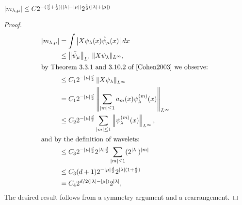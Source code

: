 \begin{lemma} \label{lem:matrix_bound}
	$\left| m_{\lambda,\mu} \right| \leq C 2^{-(\frac{d}{2}+\frac{1}{2})\left| \left| \lambda \right|-\left| \mu \right| \right|}2^{\frac{1}{2}(\left| \lambda \right|+\left| \mu \right|)}$
\end{lemma}
\begin{proof}
	\begin{align*}
		\abs{m_{\lambda,\mu}} 	&= \int \abs{X \psi_{\lambda}(x) \tilde{\psi}_{\mu}(x)} dx \\
								&\leq \norm{\tilde{\psi}_\mu}_{L^1} \| X \psi_\lambda \|_{L^\infty}, \\ %
							\intertext{by Theorem 3.3.1 and 3.10.2 of \cite{Cohen2003} we observe: }
								&\leq C_1 2^{-\card{\mu}\frac{d}{2}}\norm{X\psi_{\lambda}}_{L^{\infty}} \\
								&= C_1 2^{-\card{\mu}\frac{d}{2}}\norm{ \sum_{\abs{m} \leq 1 } a_m(x) \psi^{(m)}_\lambda(x) }_{L^{\infty}} \\
								&\leq C_2 2^{-\card{\mu}\frac{d}{2}}\sum_{\card{m}\leq 1}\norm{\psi_{\lambda}^{(m)}(x)}_{L^{\infty}} , \\
							\intertext{and by the definition of wavelets:}
								&\leq C_3 2^{-\card{\mu}\frac{d}{2}} 2^{\card{\lambda}\frac{d}{2}} \sum_{\card{m}\leq 1} (2^{\card{\lambda}})^{\abs{m}} \\
								&\leq C_3 (d+1) 2^{-\card{\mu}\frac{d}{2}} 2^{\card{\lambda}(1+\frac{d}{2})} \\
								&= C_4 2^{d/2(\card{\lambda} - \card{\mu})}2^{\card{\lambda}},
	\end{align*}
	The desired result follows from a symmetry argument and a rearrangement. 
\end{proof}

